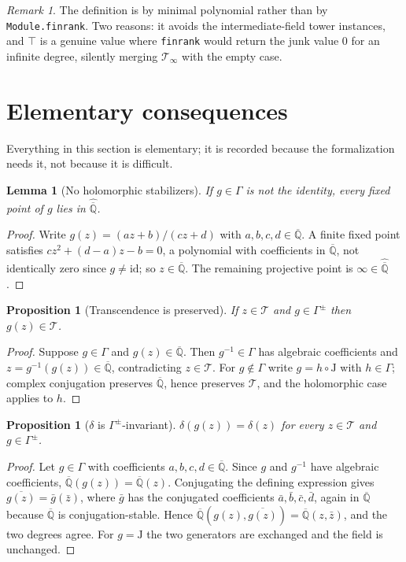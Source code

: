 \documentclass[11pt]{article}
\theoremstyle{plain}
\newtheorem{lemma}[theorem]{Lemma}
\newtheorem{proposition}[theorem]{Proposition}
\theoremstyle{definition}
\theoremstyle{remark}
\newtheorem*{remark}{Remark}
\newcommand{\Q}{\mathbb{Q}}
\newcommand{\Alg}{\overline{\Q}}
\newcommand{\Tc}{\mathcal{T}}
\newcommand{\PAlg}{\widehat{\Alg}}
\newcommand{\J}{\mathrm{J}}
\newcommand{\lean}[1]{\textup{\texttt{#1}}}
\begin{document}
\begin{remark}
The definition is by minimal polynomial rather than by
\lean{Module.finrank}. Two reasons: it avoids the intermediate-field tower
instances, and $\top$ is a genuine value where \lean{finrank} would return the
junk value $0$ for an infinite degree, silently merging $\Tc_\infty$ with the
empty case.
\end{remark}

\section{Elementary consequences}

Everything in this section is elementary; it is recorded because the
formalization needs it, not because it is difficult.

\begin{lemma}[No holomorphic stabilizers]\label{lem:stab}
If $g\in\Gamma$ is not the identity, every fixed point of $g$ lies in $\PAlg$.
\end{lemma}

\begin{proof}
Write $g(z)=(az+b)/(cz+d)$ with $a,b,c,d\in\Alg$. A finite fixed point
satisfies $cz^2+(d-a)z-b=0$, a polynomial with coefficients in $\Alg$, not
identically zero since $g\ne\mathrm{id}$; so $z\in\Alg$. The remaining
projective point is $\infty\in\PAlg$.
\end{proof}

\begin{proposition}[Transcendence is preserved]\label{prop:preserve}
If $z\in\Tc$ and $g\in\Gamma^{\pm}$ then $g(z)\in\Tc$.
\end{proposition}

\begin{proof}
Suppose $g\in\Gamma$ and $g(z)\in\Alg$. Then $g^{-1}\in\Gamma$ has algebraic
coefficients and $z=g^{-1}(g(z))\in\Alg$, contradicting $z\in\Tc$. For
$g\notin\Gamma$ write $g=h\circ\J$ with $h\in\Gamma$; complex conjugation
preserves $\Alg$, hence preserves $\Tc$, and the holomorphic case applies
to $h$.
\end{proof}

\begin{proposition}[$\delta$ is $\Gamma^{\pm}$-invariant]\label{prop:inv}
$\delta(g(z))=\delta(z)$ for every $z\in\Tc$ and $g\in\Gamma^{\pm}$.
\end{proposition}

\begin{proof}
Let $g\in\Gamma$ with coefficients $a,b,c,d\in\Alg$. Since $g$ and $g^{-1}$
have algebraic coefficients, $\Alg(g(z))=\Alg(z)$. Conjugating the defining
expression gives $\overline{g(z)}=\bar g(\bar z)$, where $\bar g$ has the
conjugated coefficients $\bar a,\bar b,\bar c,\bar d$, again in $\Alg$ because
$\Alg$ is conjugation-stable. Hence
$\Alg(g(z),\overline{g(z)})=\Alg(z,\bar z)$, and the two degrees agree. For
$g=\J$ the two generators are exchanged and the field is unchanged.
\end{proof}
\end{document}
